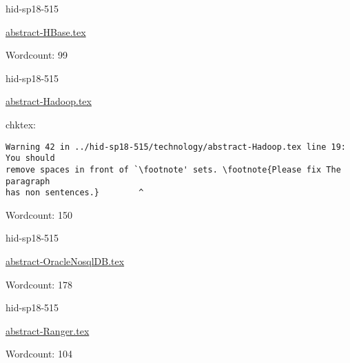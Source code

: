 \begin{IU}

hid-sp18-515

\href{https://github.com/cloudmesh-community/hid-sp18-515/blob/master//technology/abstract-HBase.tex}{abstract-HBase.tex}

 

Wordcount: 99

\end{IU}



\begin{IU}

hid-sp18-515

\href{https://github.com/cloudmesh-community/hid-sp18-515/blob/master//technology/abstract-Hadoop.tex}{abstract-Hadoop.tex}

 
chktex:
\begin{tiny}
\begin{verbatim}
Warning 42 in ../hid-sp18-515/technology/abstract-Hadoop.tex line 19: You should
remove spaces in front of `\footnote' sets. \footnote{Please fix The paragraph
has non sentences.}        ^
\end{verbatim}
\end{tiny}

Wordcount: 150

\end{IU}



\begin{IU}

hid-sp18-515

\href{https://github.com/cloudmesh-community/hid-sp18-515/blob/master//technology/abstract-OracleNosqlDB.tex}{abstract-OracleNosqlDB.tex}

 

Wordcount: 178

\end{IU}



\begin{IU}

hid-sp18-515

\href{https://github.com/cloudmesh-community/hid-sp18-515/blob/master//technology/abstract-Ranger.tex}{abstract-Ranger.tex}

 

Wordcount: 104

\end{IU}

